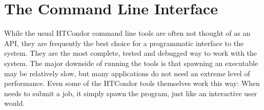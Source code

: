 \section{\label{API-commandline} The Command Line Interface}

While the usual HTCondor command line tools are often not thought of
as an API, they are frequently the best choice for a programmatic
interface to the system.  They are the most complete, tested and debugged
way to work with the system.  The major downside of running the tools
is that spawning an executable may be relatively slow, but many applications
do not need an extreme level of performance.  Even some of the HTCondor 
tools themselves work this way:  When  needs to submit
a job, it simply spawn the  program, just like an interactive
user would.

